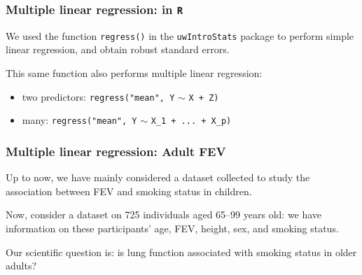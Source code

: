 \documentclass[12pt, 
hyperref={colorlinks=true, linkcolor=blue, urlcolor=cyan}]{beamer}
\begin{document}
\begin{frame}
\frametitle{Multiple linear regression: in \texttt{R}}

We used the function \texttt{regress()} in the \texttt{uwIntroStats} package to perform simple linear regression, and obtain robust standard errors.

This same function also performs multiple linear regression: 
\begin{itemize}
\item two predictors: \texttt{regress("mean", Y} $\sim$ \texttt{X + Z)}
\item many: \texttt{regress("mean", Y} $\sim$ \texttt{X\_1 + ... + X\_p)}
\end{itemize}
\end{frame}

\begin{frame}
\frametitle{Multiple linear regression: Adult FEV}

Up to now, we have mainly considered a dataset collected to study the association between FEV and smoking status in children.

Now, consider a dataset on 725 individuals aged 65--99 years old: we have information on these participants' age, FEV, height, sex, and smoking status.

Our scientific question is: is lung function associated with smoking status in older adults?
\end{frame}

\end{document}
